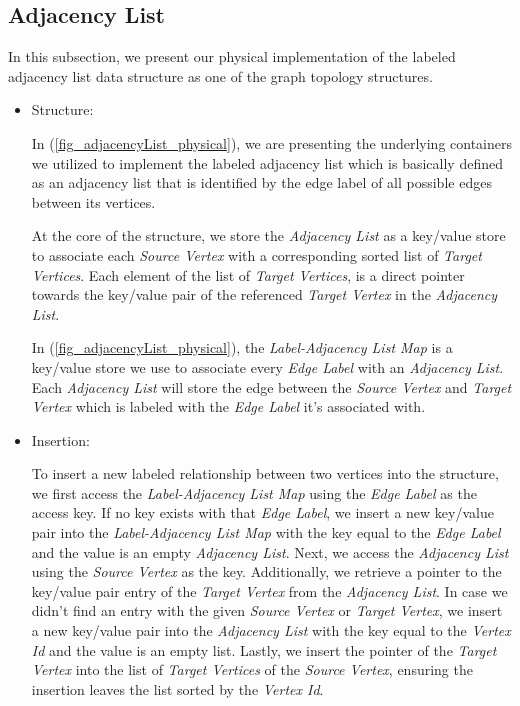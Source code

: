 {\subsection{Adjacency List}
\label{adjList_physical}

In this subsection, we present our physical implementation of the labeled adjacency list data structure as one of the graph topology structures.

\begin{itemize}

\item{Structure:}

In (\ref{fig_adjacencyList_physical}), we are presenting the underlying containers we utilized to implement the labeled adjacency list which is basically defined as an adjacency list that is identified by the edge label of all possible edges between its vertices.

At the core of the structure, we store the \textit{Adjacency List} as a key/value store to associate each \textit{Source Vertex} with a corresponding sorted list of \textit{Target Vertices}. Each element of the list of \textit{Target Vertices}, is a direct pointer towards the key/value pair of the referenced \textit{Target Vertex} in the \textit{Adjacency List}.

In (\ref{fig_adjacencyList_physical}), the \textit{Label-Adjacency List Map} is a key/value store we use to associate every \textit{Edge Label} with an \textit{Adjacency List}. Each \textit{Adjacency List} will store the edge between the \textit{Source Vertex} and \textit{Target Vertex} which is labeled with the \textit{Edge Label} it's associated with.

\item{Insertion:}

To insert a new labeled relationship between two vertices into the structure, we first access the \textit{Label-Adjacency List Map} using the \textit{Edge Label} as the access key. If no key exists with that \textit{Edge Label}, we insert a new key/value pair into the \textit{Label-Adjacency List Map} with the key equal to the \textit{Edge Label} and the value is an empty \textit{Adjacency List}. Next, we access the \textit{Adjacency List} using the \textit{Source Vertex} as the key. Additionally, we retrieve a pointer to the key/value pair entry of the \textit{Target Vertex} from the \textit{Adjacency List}. In case we didn't find an entry with the given \textit{Source Vertex} or \textit{Target Vertex}, we insert a new key/value pair into the \textit{Adjacency List} with the key equal to the \textit{Vertex Id} and the value is an empty list. Lastly, we insert the pointer of the \textit{Target Vertex} into the list of \textit{Target Vertices} of the \textit{Source Vertex}, ensuring the insertion leaves the list sorted by the \textit{Vertex Id}.


\end{itemize}}
